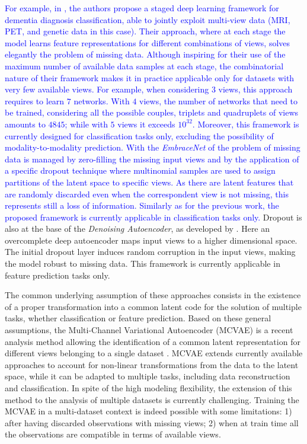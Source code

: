 \textcolor{blue}{
	For example, in \cite{Zhou2019a}, the authors propose a staged deep learning framework for dementia diagnosis classification,
	able to jointly exploit multi-view data (MRI, PET, and genetic data in this case).
	Their approach, where at each stage the model learns feature representations for different combinations of views, solves elegantly the problem of missing data.
	Although inspiring for their use of the maximum number of available data samples at each stage,
	the combinatorial nature of their framework makes it in practice applicable only for datasets with very few available views.
	For example, when considering $3$ views, this approach requires to learn $7$ networks.
	With $4$ views, the number of networks that need to be trained, considering all the possible couples, triplets and quadruplets of views amounts to $4845$;
	while with $5$ views it exceeds $10^{32}$.
	Moreover, this framework is currently designed for classification tasks only, excluding the possibility of modality-to-modality prediction.
}
\textcolor{blue}{
	With the \textit{EmbraceNet} of \cite{embracenet} the problem of missing data is managed by zero-filling the missing input views and by the application of a specific dropout technique where multinomial samples are used to assign partitions of the latent space to specific views.
	As there are latent features that are randomly discarded even when the correspondent view is not missing, this represents still a loss of information.
	Similarly as for the previous work, the proposed framework is currently applicable in classification tasks only.
}
Dropout is also at the base of the \textit{Denoising Autoencoder}, as developed by \cite{dae}.
Here an overcomplete deep autoencoder maps input views to a higher dimensional space.
The initial dropout layer induces random corruption in the input views, making the model robust to missing data.
This framework is currently applicable in feature prediction tasks only.

The common underlying assumption of these approaches consists in the existence of a
proper transformation into a common latent code for the solution of multiple tasks,
whether classification or feature prediction.
%
Based on these general assumptions,
the Multi-Channel Variational Autoencoder (MCVAE) \citep{Antelmi2019}
is a recent  analysis method allowing the identification of a common latent representation for different views belonging to a single dataset .
MCVAE extends currently available approaches to account for non-linear transformations from the data to the latent space,
while it can be adapted to multiple tasks, including data reconstruction and classification.
In spite of the high modeling flexibility, the extension of this method to the analysis of multiple datasets is currently challenging.
Training the MCVAE in a multi-dataset context is indeed possible with some limitations:
1) after having discarded observations with missing views;
2) when at train time all the observations are compatible in terms of available views.

